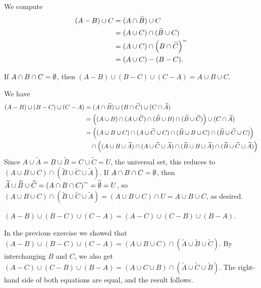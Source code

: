\documentclass{report}
\newcommand*{\comp}[1]{\widetilde{#1}}
\begin{document}
\begin{solution}
We compute
\[
\begin{aligned}
    (A - B)\cup C &= (A\cap \widetilde{B})\cup C \\
    &= (A\cup C)\cap(\widetilde{B}\cup C) \\
    &= (A\cup C)\cap\prn{B\cap \widetilde{C}}^{\sim} \\
    &= (A\cup C)-\prn{B - C}.
\end{aligned}
\]
\end{solution}

\begin{exercise}
If $A\cap B\cap C = \emptyset$, then $(A-B)\cup(B-C)\cup(C-A)=A\cup B\cup C$.
\end{exercise}

\begin{solution}
We have
\[
\begin{aligned}
    (A-B)\cup(B-C)\cup(C-A) &= (A\cap \comp{B})\cup(B\cap \comp{C})\cup(C\cap\comp{A})\\
    &= \prn{(A\cup B) \cap (A\cup\comp C)\cap (\comp B \cup B)\cap (\comp B \cup \comp C)}\cup(C\cap\comp A)\\
    &= \prn{(A\cup B\cup C) \cap (A\cup\comp C\cup C)\cap (\comp B \cup B\cup C)\cap (\comp B \cup \comp C\cup C)}\\
    & \quad \cap\prn{(A\cup B\cup\comp A) \cap (A\cup\comp C\cup\comp A)\cap (\comp B \cup B\cup\comp A)\cap (\comp B \cup \comp C\cup\comp A)}\\
\end{aligned}
\]
Since $A\cup\comp A = B\cup\comp B =C\cup\comp C= U$, the universal set, this reduces to
$(A\cup B\cup C) \cap (\comp B \cup \comp C\cup\comp A)$.
If $A\cap B\cap C=\emptyset$,  then $\comp A\cup\comp B\cup\comp C = \prn{A\cap B\cap C}^{\sim}=\comp\eset=U$,
so $(A\cup B\cup C) \cap (\comp B \cup \comp C\cup\comp A) = (A\cup B\cup C)\cap U = A\cup B\cup C$, as desired.
\end{solution}

\begin{exercise}
$(A-B)\cup(B-C)\cup(C-A)=(A-C)\cup(C-B)\cup(B-A)$.
\end{exercise}

\begin{solution}
In the previous exercise we showed that
$(A-B)\cup(B-C)\cup(C-A)=(A\cup B\cup C) \cap (\comp A\cup \comp B \cup \comp C)$.
By interchanging $B$ and $C$, we also get
$(A-C)\cup(C-B)\cup(B-A)=(A\cup C\cup B) \cap (\comp A\cup \comp C \cup \comp B)$.
The right-hand side of both equations are equal, and the result follows.
\end{solution}
\end{document}
